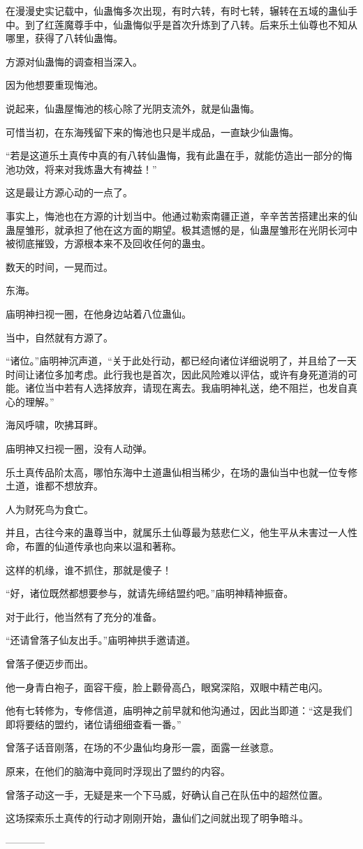 \begin{this_body}
在漫漫史实记载中，仙蛊悔多次出现，有时六转，有时七转，辗转在五域的蛊仙手中。到了红莲魔尊手中，仙蛊悔似乎是首次升炼到了八转。后来乐土仙尊也不知从哪里，获得了八转仙蛊悔。

方源对仙蛊悔的调查相当深入。

因为他想要重现悔池。

说起来，仙蛊屋悔池的核心除了光阴支流外，就是仙蛊悔。

可惜当初，在东海残留下来的悔池也只是半成品，一直缺少仙蛊悔。

“若是这道乐土真传中真的有八转仙蛊悔，我有此蛊在手，就能仿造出一部分的悔池功效，将来对我炼蛊大有裨益！”

这是最让方源心动的一点了。

事实上，悔池也在方源的计划当中。他通过勒索南疆正道，辛辛苦苦搭建出来的仙蛊屋雏形，就承担了他在这方面的期望。极其遗憾的是，仙蛊屋雏形在光阴长河中被彻底摧毁，方源根本来不及回收任何的蛊虫。

数天的时间，一晃而过。

东海。

庙明神扫视一圈，在他身边站着八位蛊仙。

当中，自然就有方源了。

“诸位。”庙明神沉声道，“关于此处行动，都已经向诸位详细说明了，并且给了一天时间让诸位多加考虑。此行我也是首次，因此风险难以评估，或许有身死道消的可能。诸位当中若有人选择放弃，请现在离去。我庙明神礼送，绝不阻拦，也发自真心的理解。”

海风呼啸，吹拂耳畔。

庙明神又扫视一圈，没有人动弹。

乐土真传品阶太高，哪怕东海中土道蛊仙相当稀少，在场的蛊仙当中也就一位专修土道，谁都不想放弃。

人为财死鸟为食亡。

并且，古往今来的蛊尊当中，就属乐土仙尊最为慈悲仁义，他生平从未害过一人性命，布置的仙道传承也向来以温和著称。

这样的机缘，谁不抓住，那就是傻子！

“好，诸位既然都想要参与，就请先缔结盟约吧。”庙明神精神振奋。

对于此行，他当然有了充分的准备。

“还请曾落子仙友出手。”庙明神拱手邀请道。

曾落子便迈步而出。

他一身青白袍子，面容干瘦，脸上颧骨高凸，眼窝深陷，双眼中精芒电闪。

他有七转修为，专修信道，庙明神之前早就和他沟通过，因此当即道：“这是我们即将要结的盟约，诸位请细细查看一番。”

曾落子话音刚落，在场的不少蛊仙均身形一震，面露一丝骇意。

原来，在他们的脑海中竟同时浮现出了盟约的内容。

曾落子动这一手，无疑是来一个下马威，好确认自己在队伍中的超然位置。

这场探索乐土真传的行动才刚刚开始，蛊仙们之间就出现了明争暗斗。

------------

\end{this_body}

